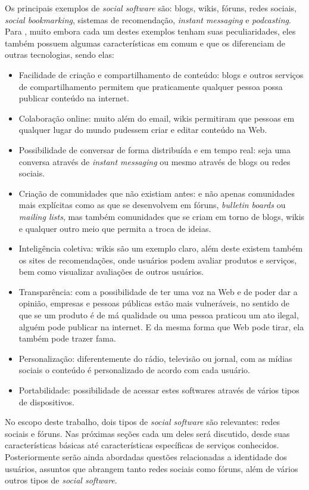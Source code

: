 \documentclass[diss]{template/setrem}
\begin{document}
Os principais exemplos de \emph{social software} são: blogs, wikis, fóruns, redes sociais, \emph{social bookmarking}, sistemas de recomendação, \emph{instant messaging} e \emph{podcasting}. Para \citet{Farkas2007}, muito embora cada um destes exemplos tenham suas peculiaridades, eles também possuem algumas características em comum e que os diferenciam de outras tecnologias, sendo elas:
\begin{itemize}
	\item Facilidade de criação e compartilhamento de conteúdo: blogs e outros serviços de compartilhamento permitem que praticamente qualquer pessoa possa publicar conteúdo na internet.
	\item Colaboração online: muito além do email, wikis permitiram que pessoas em qualquer lugar do mundo pudessem criar e editar conteúdo na Web.
	\item Possibilidade de conversar de forma distribuída e em tempo real: seja uma conversa através de \emph{instant messaging} ou mesmo através de blogs ou redes sociais.
	\item Criação de comunidades que não existiam antes: e não apenas comunidades mais explícitas como as que se desenvolvem em fóruns, \emph{bulletin boards} ou \emph{mailing lists}, mas também comunidades que se criam em torno de blogs, wikis e qualquer outro meio que permita a troca de ideias.
	\item Inteligência coletiva: wikis são um exemplo claro, além deste existem também os sites de recomendações, onde usuários podem avaliar produtos e serviços, bem como visualizar avaliações de outros usuários.
	\item Transparência: com a possibilidade de ter uma voz na Web e de poder dar a opinião, empresas e pessoas públicas estão mais vulneráveis, no sentido de que se um produto é de má qualidade ou uma pessoa praticou um ato ilegal, alguém pode publicar na internet. E da mesma forma que Web pode tirar, ela também pode trazer fama.
	\item Personalização: diferentemente do rádio, televisão ou jornal, com as mídias sociais o conteúdo é personalizado de acordo com cada usuário.
	\item Portabilidade: possibilidade de acessar estes softwares através de vários tipos de dispositivos.
\end{itemize}

No escopo deste trabalho, dois tipos de \emph{social software} são relevantes: redes sociais e fóruns. Nas próximas seções cada um deles será discutido, desde suas características básicas até características específicas de serviços conhecidos. Posteriormente serão ainda abordadas questões relacionadas a identidade dos usuários, assuntos que abrangem tanto redes sociais como fóruns, além de vários outros tipos de \emph{social software}.
\end{document}
